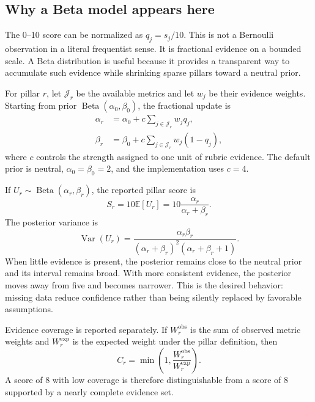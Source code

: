 \documentclass[11pt]{article}
\newcommand{\E}{\mathbb{E}}
\newcommand{\Var}{\operatorname{Var}}
\newcommand{\calJ}{\mathcal{J}}
\begin{document}
\subsection{Why a Beta model appears here}

The 0--10 score can be normalized as $q_j=s_j/10$. This is not a Bernoulli observation in a literal frequentist sense. It is fractional evidence on a bounded scale. A Beta distribution is useful because it provides a transparent way to accumulate such evidence while shrinking sparse pillars toward a neutral prior.

For pillar $r$, let $\calJ_r$ be the available metrics and let $w_j$ be their evidence weights. Starting from prior $\operatorname{Beta}(\alpha_0,\beta_0)$, the fractional update is
\begin{align}
\alpha_r &= \alpha_0+c\sum_{j\in\calJ_r}w_jq_j,\\
\beta_r  &= \beta_0+c\sum_{j\in\calJ_r}w_j(1-q_j),
\label{eq:betaupdate}
\end{align}
where $c$ controls the strength assigned to one unit of rubric evidence. The default prior is neutral, $\alpha_0=\beta_0=2$, and the implementation uses $c=4$.

If $U_r\sim\operatorname{Beta}(\alpha_r,\beta_r)$, the reported pillar score is
\begin{equation}
S_r=10\E[U_r]=10\frac{\alpha_r}{\alpha_r+\beta_r}.
\label{eq:pillarscore}
\end{equation}
The posterior variance is
\begin{equation}
\Var(U_r)=\frac{\alpha_r\beta_r}{(\alpha_r+\beta_r)^2(\alpha_r+\beta_r+1)}.
\label{eq:betavar}
\end{equation}
When little evidence is present, the posterior remains close to the neutral prior and its interval remains broad. With more consistent evidence, the posterior moves away from five and becomes narrower. This is the desired behavior: missing data reduce confidence rather than being silently replaced by favorable assumptions.

Evidence coverage is reported separately. If $W_r^{\mathrm{obs}}$ is the sum of observed metric weights and $W_r^{\mathrm{exp}}$ is the expected weight under the pillar definition, then
\begin{equation}
C_r=\min\left(1,\frac{W_r^{\mathrm{obs}}}{W_r^{\mathrm{exp}}}\right).
\end{equation}
A score of 8 with low coverage is therefore distinguishable from a score of 8 supported by a nearly complete evidence set.
\end{document}
